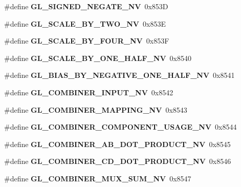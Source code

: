 \begin{DoxyCompactItemize}
\item 
\#define {\bfseries G\+L\+\_\+\+S\+I\+G\+N\+E\+D\+\_\+\+N\+E\+G\+A\+T\+E\+\_\+\+N\+V}~0x853\+D\label{_s_d_l__opengl_8h_a5c3d751967eabe1e22db62a9dbc15f23}

\item 
\#define {\bfseries G\+L\+\_\+\+S\+C\+A\+L\+E\+\_\+\+B\+Y\+\_\+\+T\+W\+O\+\_\+\+N\+V}~0x853\+E\label{_s_d_l__opengl_8h_a0a75d122faea551b19a9b64ec03a8d3c}

\item 
\#define {\bfseries G\+L\+\_\+\+S\+C\+A\+L\+E\+\_\+\+B\+Y\+\_\+\+F\+O\+U\+R\+\_\+\+N\+V}~0x853\+F\label{_s_d_l__opengl_8h_ac925964c1ef8efe8c07ce6ff633f6b6a}

\item 
\#define {\bfseries G\+L\+\_\+\+S\+C\+A\+L\+E\+\_\+\+B\+Y\+\_\+\+O\+N\+E\+\_\+\+H\+A\+L\+F\+\_\+\+N\+V}~0x8540\label{_s_d_l__opengl_8h_ab245df801bb5089f11f3dce96d8ff1ce}

\item 
\#define {\bfseries G\+L\+\_\+\+B\+I\+A\+S\+\_\+\+B\+Y\+\_\+\+N\+E\+G\+A\+T\+I\+V\+E\+\_\+\+O\+N\+E\+\_\+\+H\+A\+L\+F\+\_\+\+N\+V}~0x8541\label{_s_d_l__opengl_8h_ac66b69ca7f52f2784825db7359a9b28d}

\item 
\#define {\bfseries G\+L\+\_\+\+C\+O\+M\+B\+I\+N\+E\+R\+\_\+\+I\+N\+P\+U\+T\+\_\+\+N\+V}~0x8542\label{_s_d_l__opengl_8h_acf47936943c4cb3a44e7759ba589a2bb}

\item 
\#define {\bfseries G\+L\+\_\+\+C\+O\+M\+B\+I\+N\+E\+R\+\_\+\+M\+A\+P\+P\+I\+N\+G\+\_\+\+N\+V}~0x8543\label{_s_d_l__opengl_8h_a7b3d91e844bdfe508cb18e16b3b14c8f}

\item 
\#define {\bfseries G\+L\+\_\+\+C\+O\+M\+B\+I\+N\+E\+R\+\_\+\+C\+O\+M\+P\+O\+N\+E\+N\+T\+\_\+\+U\+S\+A\+G\+E\+\_\+\+N\+V}~0x8544\label{_s_d_l__opengl_8h_add52627ebaf78ad5374e17435b1bad64}

\item 
\#define {\bfseries G\+L\+\_\+\+C\+O\+M\+B\+I\+N\+E\+R\+\_\+\+A\+B\+\_\+\+D\+O\+T\+\_\+\+P\+R\+O\+D\+U\+C\+T\+\_\+\+N\+V}~0x8545\label{_s_d_l__opengl_8h_a962d60fe8d7c581e25b60ed55c426345}

\item 
\#define {\bfseries G\+L\+\_\+\+C\+O\+M\+B\+I\+N\+E\+R\+\_\+\+C\+D\+\_\+\+D\+O\+T\+\_\+\+P\+R\+O\+D\+U\+C\+T\+\_\+\+N\+V}~0x8546\label{_s_d_l__opengl_8h_ad15a48be9e3f50fd4a9692e76930e297}

\item 
\#define {\bfseries G\+L\+\_\+\+C\+O\+M\+B\+I\+N\+E\+R\+\_\+\+M\+U\+X\+\_\+\+S\+U\+M\+\_\+\+N\+V}~0x8547\label{_s_d_l__opengl_8h_a45deebc1bbaa4d760e611fa4e15f73a7}


\end{DoxyCompactItemize}
